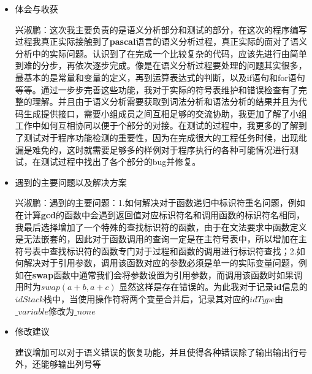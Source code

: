 \documentclass[]{ctexart}
\begin{document}
\begin{itemize}
\item
  体会与收获

  兴淑鹏：这次我主要负责的是语义分析部分和测试的部分，在这次的程序编写过程我真正实际接触到了\textbf{pascal}语言的语义分析过程，真正实际的面对了语义分析中的实际问题。认识到了在完成一个比较复杂的代码，应该先进行由简单到难的分步，再依次逐步完成。像是在语义分析过程要处理的问题其实很多，最基本的是常量和变量的定义，再到运算表达式的判断，以及if语句和for语句等等。通过一步步完善这些功能，我对于实际的符号表维护和错误检查有了完整的理解。并且由于语义分析需要获取到词法分析和语法分析的结果并且为代码生成提供接口，需要小组成员之间互相足够的交流协助，我更加了解了小组工作中如何互相协同以便于个部分的对接。在测试的过程中，我更多的了解到了测试对于程序功能检测的重要性，因为在完成很大的工程任务时候，出现纰漏是难免的，这时就需要足够多的样例对于程序执行的各种可能情况进行测试，在测试过程中找出了各个部分的bug并修复。
\item
  遇到的主要问题以及解决方案

  兴淑鹏：遇到的主要问题：1.如何解决对于函数递归中标识符重名问题，例如在计算\textbf{gcd}的函数中会遇到返回值对应标识符名和调用函数的标识符名相同，我最后选择增加了一个特殊的查找标识符的函数，由于在文法要求中函数定义是无法嵌套的，因此对于函数调用的查询一定是在主符号表中，所以增加在主符号表中查找标识符的函数专门对于过程和函数的调用进行标识符查找；2.如何解决对于引用参数，调用该函数对应的参数必须是单一的实际变量问题，例如在\textbf{swap}函数中通常我们会将参数设置为引用参数，而调用该函数时如果调用时为\(swap(a+b,a+c)\)
  显然这样是存在错误的。为此我对于记录\textbf{id}信息的\(idStack\)栈中，当使用操作符将两个变量合并后，记录其对应的\(idType\)由\(\_variable\)修改为\(\_none\)
\item
  修改建议

  建议增加可以对于语义错误的恢复功能，并且使得各种错误除了输出输出行号外，还能够输出列号等
\end{itemize}
\end{document}
